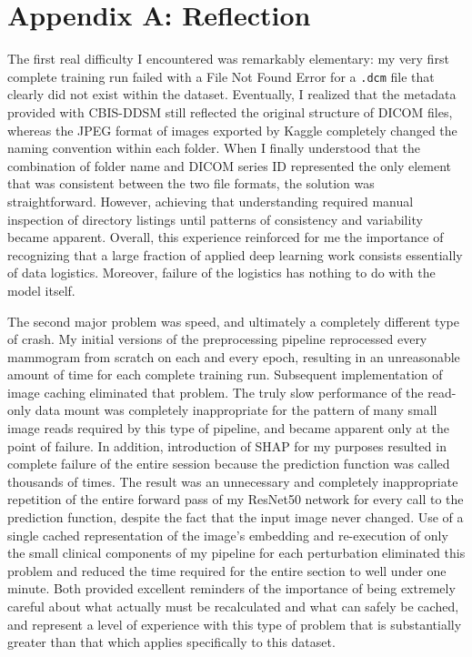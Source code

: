 \appendix

\section{Appendix A: Reflection}
\label{appx:reflection}

The first real difficulty I encountered was remarkably elementary: my very first complete training run failed with a File Not Found Error for a \texttt{.dcm} file that clearly did not exist within the dataset. Eventually, I realized that the metadata provided with CBIS-DDSM still reflected the original structure of DICOM files, whereas the JPEG format of images exported by Kaggle completely changed the naming convention within each folder. When I finally understood that the combination of folder name and DICOM series ID represented the only element that was consistent between the two file formats, the solution was straightforward. However, achieving that understanding required manual inspection of directory listings until patterns of consistency and variability became apparent. Overall, this experience reinforced for me the importance of recognizing that a large fraction of applied deep learning work consists essentially of data logistics. Moreover, failure of the logistics has nothing to do with the model itself.

The second major problem was speed, and ultimately a completely different type of crash. My initial versions of the preprocessing pipeline reprocessed every mammogram from scratch on each and every epoch, resulting in an unreasonable amount of time for each complete training run. Subsequent implementation of image caching eliminated that problem. The truly slow performance of the read-only data mount was completely inappropriate for the pattern of many small image reads required by this type of pipeline, and became apparent only at the point of failure. In addition, introduction of SHAP for my purposes resulted in complete failure of the entire session because the prediction function was called thousands of times. The result was an unnecessary and completely inappropriate repetition of the entire forward pass of my ResNet50 network for every call to the prediction function, despite the fact that the input image never changed. Use of a single cached representation of the image's embedding and re-execution of only the small clinical components of my pipeline for each perturbation eliminated this problem and reduced the time required for the entire section to well under one minute. Both provided excellent reminders of the importance of being extremely careful about what actually must be recalculated and what can safely be cached, and represent a level of experience with this type of problem that is substantially greater than that which applies specifically to this dataset.

